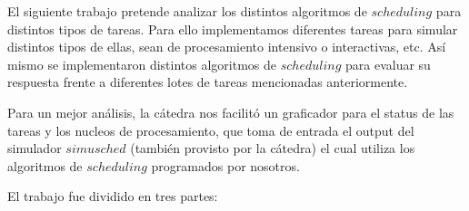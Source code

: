 El siguiente trabajo pretende analizar los distintos algoritmos de $scheduling$ para distintos tipos de tareas. 
Para ello implementamos diferentes tareas para simular distintos tipos de ellas, sean de procesamiento intensivo o interactivas, etc.
Así mismo se implementaron distintos algoritmos de $scheduling$ para evaluar su respuesta frente a diferentes lotes de tareas mencionadas anteriormente.

Para un mejor análisis, la cátedra nos facilitó un graficador para el status de las tareas y los nucleos de procesamiento, que toma de entrada el output del simulador $simusched$ (también provisto por la cátedra) el cual utiliza los algoritmos de $scheduling$ programados por nosotros.

El trabajo fue dividido en tres partes:
